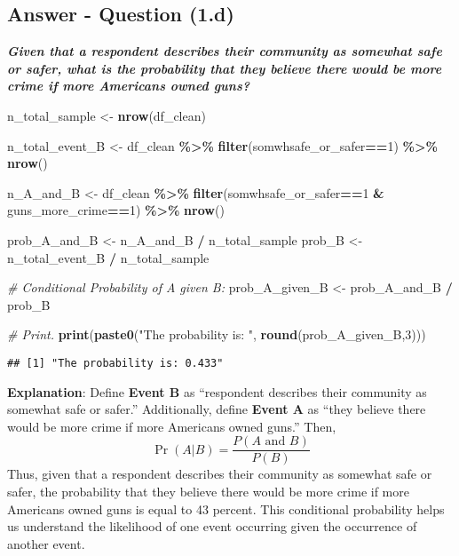 \documentclass[
  11pt,
]{article}
\newenvironment{Shaded}{\begin{snugshade}}{\end{snugshade}}
\newcommand{\CommentTok}[1]{\textcolor[rgb]{0.56,0.35,0.01}{\textit{#1}}}
\newcommand{\DecValTok}[1]{\textcolor[rgb]{0.00,0.00,0.81}{#1}}
\newcommand{\FunctionTok}[1]{\textcolor[rgb]{0.13,0.29,0.53}{\textbf{#1}}}
\newcommand{\NormalTok}[1]{#1}
\newcommand{\OtherTok}[1]{\textcolor[rgb]{0.56,0.35,0.01}{#1}}
\newcommand{\SpecialCharTok}[1]{\textcolor[rgb]{0.81,0.36,0.00}{\textbf{#1}}}
\newcommand{\StringTok}[1]{\textcolor[rgb]{0.31,0.60,0.02}{#1}}
\begin{document}
\subsection{Answer - Question (1.d)}\label{answer---question-1.d}

\textbf{\emph{Given that a respondent describes their community as
somewhat safe or safer, what is the probability that they believe there
would be more crime if more Americans owned guns?}}

\begin{Shaded}
\begin{Highlighting}[]
\NormalTok{n\_total\_sample }\OtherTok{\textless{}{-}} \FunctionTok{nrow}\NormalTok{(df\_clean)}

\NormalTok{n\_total\_event\_B }\OtherTok{\textless{}{-}}\NormalTok{ df\_clean }\SpecialCharTok{\%\textgreater{}\%}
  \FunctionTok{filter}\NormalTok{(somwhsafe\_or\_safer}\SpecialCharTok{==}\DecValTok{1}\NormalTok{) }\SpecialCharTok{\%\textgreater{}\%}
  \FunctionTok{nrow}\NormalTok{()}

\NormalTok{n\_A\_and\_B }\OtherTok{\textless{}{-}}\NormalTok{ df\_clean }\SpecialCharTok{\%\textgreater{}\%}
  \FunctionTok{filter}\NormalTok{(somwhsafe\_or\_safer}\SpecialCharTok{==}\DecValTok{1} \SpecialCharTok{\&}\NormalTok{ guns\_more\_crime}\SpecialCharTok{==}\DecValTok{1}\NormalTok{) }\SpecialCharTok{\%\textgreater{}\%}
  \FunctionTok{nrow}\NormalTok{()}

\NormalTok{prob\_A\_and\_B }\OtherTok{\textless{}{-}}\NormalTok{ n\_A\_and\_B }\SpecialCharTok{/}\NormalTok{ n\_total\_sample}
\NormalTok{prob\_B }\OtherTok{\textless{}{-}}\NormalTok{ n\_total\_event\_B }\SpecialCharTok{/}\NormalTok{ n\_total\_sample}

\CommentTok{\# Conditional Probability of A given B:}
\NormalTok{prob\_A\_given\_B }\OtherTok{\textless{}{-}}\NormalTok{ prob\_A\_and\_B }\SpecialCharTok{/}\NormalTok{ prob\_B}

\CommentTok{\# Print.}
\FunctionTok{print}\NormalTok{(}\FunctionTok{paste0}\NormalTok{(}\StringTok{"The probability is: "}\NormalTok{, }\FunctionTok{round}\NormalTok{(prob\_A\_given\_B,}\DecValTok{3}\NormalTok{)))}
\end{Highlighting}
\end{Shaded}

\begin{verbatim}
## [1] "The probability is: 0.433"
\end{verbatim}

\textbf{Explanation}: Define \textbf{Event B} as ``respondent describes
their community as somewhat safe or safer.'' Additionally, define
\textbf{Event A} as ``they believe there would be more crime if more
Americans owned guns.'' Then,
\[\Pr(A | B) = \frac{P(A\text{ and }B)}{P(B)}\] Thus, given that a
respondent describes their community as somewhat safe or safer, the
probability that they believe there would be more crime if more
Americans owned guns is equal to 43 percent. This conditional
probability helps us understand the likelihood of one event occurring
given the occurrence of another event.
\end{document}

